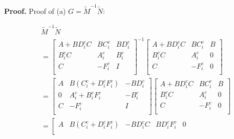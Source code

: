 \documentclass[trsc,nonblindrev]{informs3} %
\begin{document}
\begin{APPENDICES}
    \textbf{Proof.} Proof of (a) $G=\tilde{M}^{-1} \tilde{N}$:

    \begin{equation}
        \begin{aligned}
             & \tilde{M}^{-1} \tilde{N}                                                              \\
             & =\left[\begin{array}{cc|c}
                    A+B D_{i}^{c} C & B    C_{i}^{c} & B    D_{i}^{c} \\
                    B_{i}^{c}   C   & A_{i}^{c}      & B_{i}^{c}      \\
                    \hline   C      & -F_{i}^{c}     & I              \\
                \end{array}\right]^{-1} \left[\begin{array}{cc|c}
                    A+B    D_{i}^{c} C & B    C_{i}^{c} & B \\
                    B_{i}^{c}   C      & A_{i}^{c}      & 0 \\
                    \hline    C        & -F_{i}^{c}     & 0 \\
                \end{array}\right] \\
             & =\left[\begin{array}{cc|c}
                    A          & B    (C_{i}^{c}+D_{i}^{c}F_{i}^{c}) & -B    D_{i}^{c} \\
                    0          & A_{i}^{c}+B_{i}^{c}  F_{i}^{c}      & -B_{i}^{c}      \\
                    \hline   C & -F_{i}^{c}                          & I               \\
                \end{array}\right]  \left[\begin{array}{cc|c}
                    A+B    D_{i}^{c} C & B    C_{i}^{c} & B \\
                    B_{i}^{c}   C      & A_{i}^{c}      & 0 \\
                    \hline    C        & -F_{i}^{c}     & 0 \\
                \end{array}\right]     \\
             & =\left[\begin{array}{cccc|c}
                    A          & B    (C_{i}^{c}+D_{i}^{c}F_{i}^{c}) & -B    D_{i}^{c}C   & B    D_{i}^{c}F_{i}^{c} & 0 \\

\end{array}
\end{aligned}
\end{equation}
\end{APPENDICES}
\end{document}

